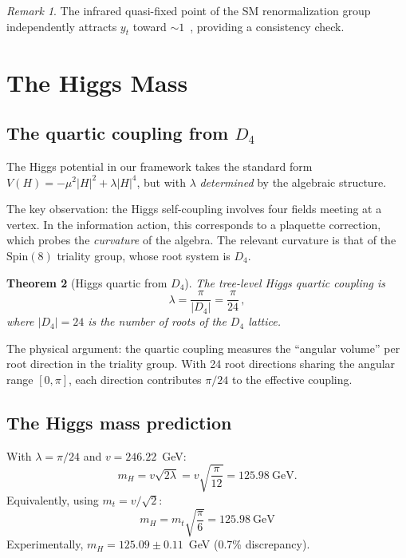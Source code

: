 \documentclass[12pt,a4paper]{article}
\newtheorem{theorem}{Theorem}
\theoremstyle{definition}
\theoremstyle{remark}
\newtheorem{remark}[theorem]{Remark}
\newcommand{\Spin}{\mathrm{Spin}}
\begin{document}
\begin{remark}
The infrared quasi-fixed point of the SM renormalization group 
independently attracts $y_t$ toward $\sim 1$~\cite{Pendleton1981,Hill1981}, 
providing a consistency check.
\end{remark}

\section{The Higgs Mass}
\label{sec:higgs}

\subsection{The quartic coupling from $D_4$}

The Higgs potential in our framework takes the standard form 
$V(H) = -\mu^2|H|^2 + \lambda|H|^4$, but with $\lambda$ \emph{determined} 
by the algebraic structure.

The key observation: the Higgs self-coupling involves four fields meeting 
at a vertex. In the information action, this corresponds to a plaquette 
correction, which probes the \emph{curvature} of the algebra. The relevant 
curvature is that of the $\Spin(8)$ triality group, whose root system is $D_4$.

\begin{theorem}[Higgs quartic from $D_4$]
The tree-level Higgs quartic coupling is
\begin{equation}
\lambda = \frac{\pi}{|D_4|} = \frac{\pi}{24}\,,
\end{equation}
where $|D_4| = 24$ is the number of roots of the $D_4$ lattice.
\end{theorem}

The physical argument: the quartic coupling measures the ``angular volume'' 
per root direction in the triality group. With 24 root directions sharing 
the angular range $[0,\pi]$, each direction contributes $\pi/24$ to the 
effective coupling.

\subsection{The Higgs mass prediction}

With $\lambda = \pi/24$ and $v = 246.22$~GeV:
\begin{equation}
m_H = v\sqrt{2\lambda} = v\sqrt{\frac{\pi}{12}} = 125.98~\text{GeV}.
\end{equation}
Equivalently, using $m_t = v/\sqrt{2}$:
\begin{equation}
\boxed{m_H = m_t\sqrt{\frac{\pi}{6}} = 125.98~\text{GeV}}
\end{equation}
Experimentally, $m_H = 125.09 \pm 0.11$~GeV (0.7\% discrepancy).
\end{document}
